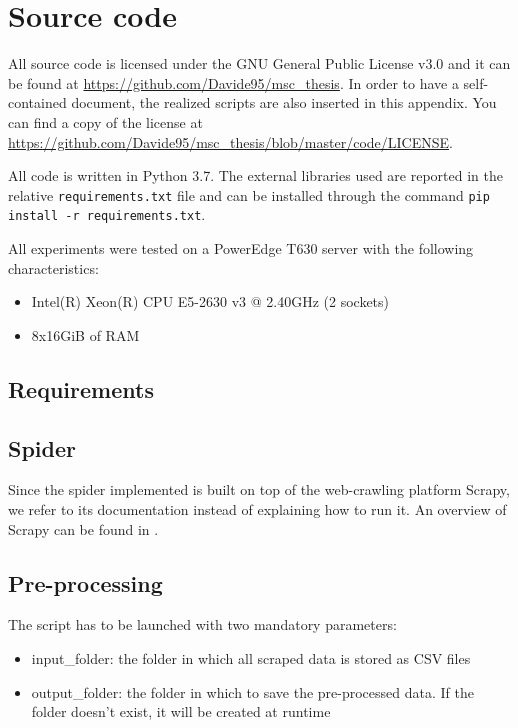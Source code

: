 \chapter{Source code}
All source code is licensed under the GNU General Public License v3.0 and it can be found at \url{https://github.com/Davide95/msc_thesis}.
In order to have a self-contained document, the realized scripts are also inserted in this appendix.
You can find a copy of the license at \url{https://github.com/Davide95/msc_thesis/blob/master/code/LICENSE}.

All code is written in Python 3.7. The external libraries used are reported in the relative \texttt{requirements.txt} file and can be installed through the command \texttt{pip install -r requirements.txt}.

All experiments were tested on a PowerEdge T630 server with the following characteristics:
\begin{itemize}
    \item Intel(R) Xeon(R) CPU E5-2630 v3 @ 2.40GHz (2 sockets)
    \item 8x16GiB of RAM
\end{itemize}

\section{Requirements}
\begin{minipage}{\linewidth}
    
\end{minipage}

\section{Spider} \label{spider}

Since the spider implemented is built on top of the web-crawling platform Scrapy, we refer to its documentation instead of explaining how to run it.
An overview of Scrapy can be found in \cite{kouzis2016learning}.



\section{Pre-processing} \label{preprocessing}
The script has to be launched with two mandatory parameters:
\begin{itemize}
    \item input\_folder: the folder in which all scraped data is stored as CSV files
    \item output\_folder: the folder in which to save the pre-processed data. If the folder doesn't exist, it will be created at runtime
\end{itemize}

